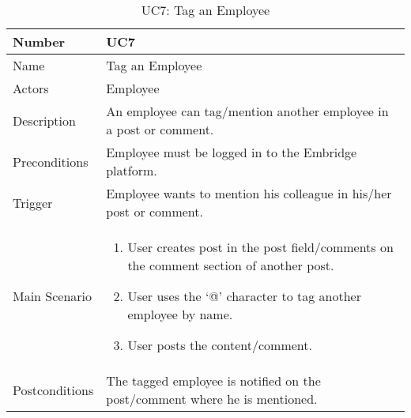 \documentclass[12pt,a4paper]{article}
\begin{document}
\begin{table}[h]
\centering
\caption{UC7: Tag an Employee}
\label{tab:uc7}
\begin{tabularx}{\textwidth}{@{}lX@{}}
\toprule

Number & UC7 \\ \midrule
Name & Tag an Employee \\
Actors & Employee\\
Description & An employee can tag/mention another employee in a post or comment.
 \\
Preconditions & 
Employee must be logged in to the Embridge platform.
 \\
 
Trigger & Employee wants to mention his colleague in his/her post or comment.\\

Main Scenario & 
\begin{enumerate}
\item User creates post in the post field/comments on the comment section of another post.
\item User uses the ‘@’ character to tag another employee by name.
\item User posts the content/comment.
\end{enumerate}
 \\
Postconditions & The tagged employee is notified on the post/comment where he is mentioned. \\
\bottomrule
\end{tabularx}
\end{table}
\end{document}
